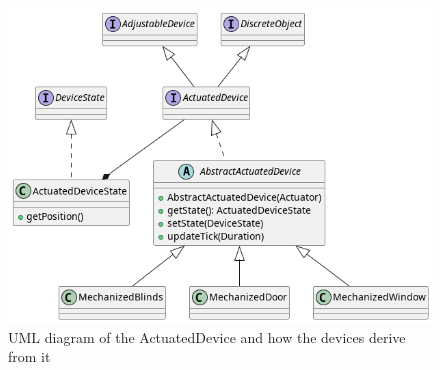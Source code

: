 \begin{figure}[H]
\centering{}
\includegraphics[width=\textwidth,height=\textheight,keepaspectratio]{magnani/uml/actuateddevice.png}
\caption{UML diagram of the ActuatedDevice and how the devices derive from it}
\label{magnani:uml:actuateddevice}
\end{figure}
